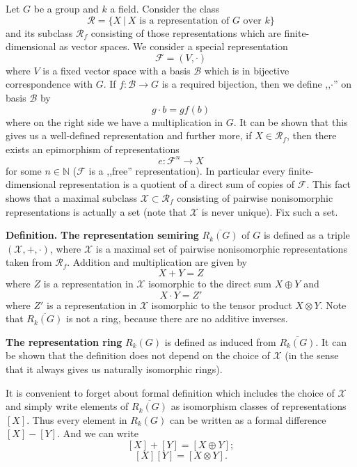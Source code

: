 \documentclass[12pt]{article}
\begin{document}
Let $G$ be a group and $k$ a field. Consider the class
$$\mathcal{R}=\{X\ |\ X\mbox{ is a representation of }G\mbox{ over }k\}$$
and its subclass $\mathcal{R}_f$ consisting of those representations which are finite-dimensional as vector spaces. We consider a special representation
$$\mathcal{F}=(V,\cdot)$$
where $V$ is a fixed vector space with a basis $\mathcal{B}$ which is in bijective correspondence with $G$. If $f:\mathcal{B}\to G$ is a required bijection, then we define ,,$\cdot$'' on basis $\mathcal{B}$ by
$$g\cdot b = gf(b)$$
where on the right side we have a multiplication in $G$. It can be shown that this gives us a well-defined representation and further more, if $X\in\mathcal{R}_f$, then there exists an epimorphism of representations
$$e:\mathcal{F}^n\to X$$
for some $n\in\mathbb{N}$ ($\mathcal{F}$ is a ,,free'' representation). In particular every finite-dimensional representation is a quotient of a direct sum of copies of $\mathcal{F}$. This fact shows that a maximal subclass $\mathcal{X}\subset\mathcal{R}_f$ consisting of pairwise nonisomorphic representations is actually a set (note that $\mathcal{X}$ is never unique). Fix such a set.

\textbf{Definition.} \textbf{The representation semiring} $\overline{R_k(G)}$ of $G$ is defined as a triple $(\mathcal{X}, +, \cdot)$, where $\mathcal{X}$ is a maximal set of pairwise nonisomorphic representations taken from $\mathcal{R}_f$. Addition and multiplication are given by
$$X+Y=Z$$
where $Z$ is a representation in $\mathcal{X}$ isomorphic to the direct sum $X\oplus Y$ and
$$X\cdot Y=Z'$$
where $Z'$ is a representation in $\mathcal{X}$ isomorphic to the tensor product $X\otimes Y$. Note that $\overline{R_k(G)}$ is not a ring, because there are no additive inverses.

\textbf{The representation ring} $R_k(G)$ is defined as  induced from $\overline{R_k(G)}$. It can be shown that the definition does not depend on the choice of $\mathcal{X}$ (in the sense that it always gives us naturally isomorphic rings).

It is convenient to forget about formal definition which includes the choice of $\mathcal{X}$ and simply write elements of $\overline{R_k(G)}$ as isomorphism classes of representations $[X]$. Thus every element in $R_k(G)$ can be written as a formal difference $[X]-[Y]$. And we can write
$$[X]+[Y]=[X\oplus Y];$$
$$[X][Y] =[X\otimes Y].$$
\end{document}
